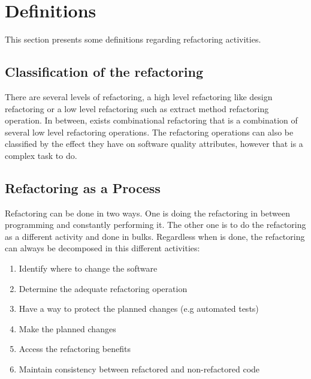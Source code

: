 \section{Definitions}


This section presents some definitions regarding refactoring activities.

\subsection{Classification of the refactoring}
There are several levels of refactoring, a high level refactoring like design refactoring or a low level refactoring such as extract method refactoring operation. 
In between, exists combinational refactoring that is a combination of several low level refactoring operations.
The refactoring operations can also be classified by the effect they have on software quality attributes, however that is a complex task to do. \cite{elish2011classification}

\subsection{Refactoring as a Process}
Refactoring can be done in two ways. %
One is doing the refactoring in between programming and constantly performing it. 
The other one is to do the refactoring as a different activity and done in bulks.
Regardless when is done, the refactoring can always be decomposed in this different activities: \cite{erb2010survey}

\begin{enumerate}
 \item Identify where to change the software
 \item Determine the adequate refactoring operation
 \item Have a way to protect the planned changes (e.g automated tests)
 \item Make the planned changes
 \item Access the refactoring benefits
 \item Maintain consistency between refactored and non-refactored code 
\end{enumerate}




